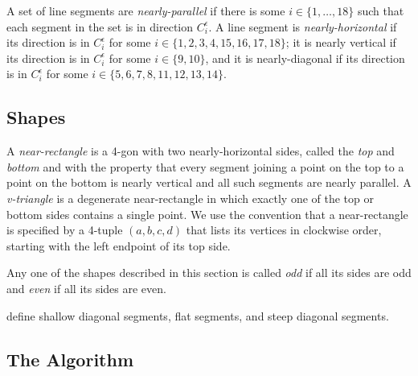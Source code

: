 \documentclass{patmorin}
\begin{document}
A set of line segments are \emph{nearly-parallel} if there is some
$i\in\{1,\ldots,18\}$ such that each segment in the set is in direction
$C_i^{\epsilon}$.  A line segment is \emph{nearly-horizontal} if its
direction is in $C_i^\epsilon$ for some $i\in\{1,2,3,4,15,16,17,18\}$;
it is nearly vertical if its direction is in $C_i^\epsilon$ for some
$i\in\{9,10\}$, and it is nearly-diagonal if its direction is in
$C_i^\epsilon$ for some $i\in\{5,6,7,8,11,12,13,14\}$.

\subsection{Shapes}


A \emph{near-rectangle} is a 4-gon with two nearly-horizontal sides,
called the \emph{top} and \emph{bottom} and with the property that every
segment joining a point on the top to a point on the bottom is nearly
vertical and all such segments are nearly parallel.  A \emph{v-triangle}
is a degenerate near-rectangle in which exactly one of the top or bottom
sides contains a single point.  We use the convention that a near-rectangle is specified by a 4-tuple $(a,b,c,d)$ that lists its vertices in clockwise order, starting with the left endpoint of its top side.

%
%
%
Any one of the shapes described in this section is called \emph{odd}
if all its sides are odd and \emph{even} if all its sides are even.

define shallow diagonal segments, flat segments, and steep diagonal segments.

\subsection{The Algorithm}
\end{document}
